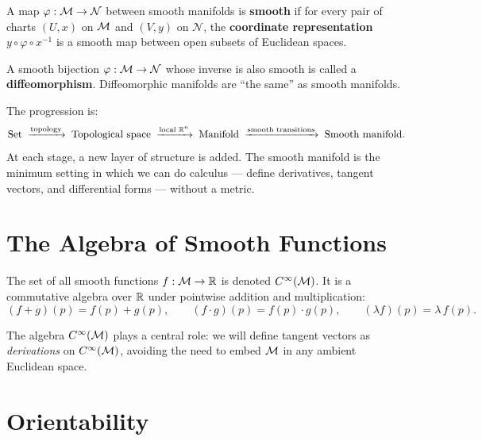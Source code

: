 \begin{definition}
A map $\varphi: \mathcal{M} \to \mathcal{N}$ between smooth manifolds is \textbf{smooth} if for every pair of charts $(U, x)$ on $\mathcal{M}$ and $(V, y)$ on $\mathcal{N}$, the \textbf{coordinate representation} $y \circ \varphi \circ x^{-1}$ is a smooth map between open subsets of Euclidean spaces.
\end{definition}

\begin{definition}[Diffeomorphism]
A smooth bijection $\varphi: \mathcal{M} \to \mathcal{N}$ whose inverse is also smooth is called a \textbf{diffeomorphism}. Diffeomorphic manifolds are ``the same'' as smooth manifolds.
\end{definition}

\begin{remark}
The progression is:
\[
\text{Set} \;\xrightarrow{\text{topology}}\; \text{Topological space} \;\xrightarrow{\text{local } \mathbb{R}^n}\; \text{Manifold} \;\xrightarrow{\text{smooth transitions}}\; \text{Smooth manifold}.
\]
At each stage, a new layer of structure is added. The smooth manifold is the minimum setting in which we can do calculus --- define derivatives, tangent vectors, and differential forms --- without a metric.
\end{remark}

\section{The Algebra of Smooth Functions}

\begin{definition}
The set of all smooth functions $f: \mathcal{M} \to \mathbb{R}$ is denoted $C^{\infty}(\mathcal{M})$. It is a commutative algebra over $\mathbb{R}$ under pointwise addition and multiplication:
\begin{equation}
(f + g)(p) = f(p) + g(p), \qquad (f \cdot g)(p) = f(p) \cdot g(p), \qquad (\lambda f)(p) = \lambda\, f(p).
\end{equation}
\end{definition}

The algebra $C^{\infty}(\mathcal{M})$ plays a central role: we will define tangent vectors as \emph{derivations} on $C^{\infty}(\mathcal{M})$, avoiding the need to embed $\mathcal{M}$ in any ambient Euclidean space.

\section{Orientability}

